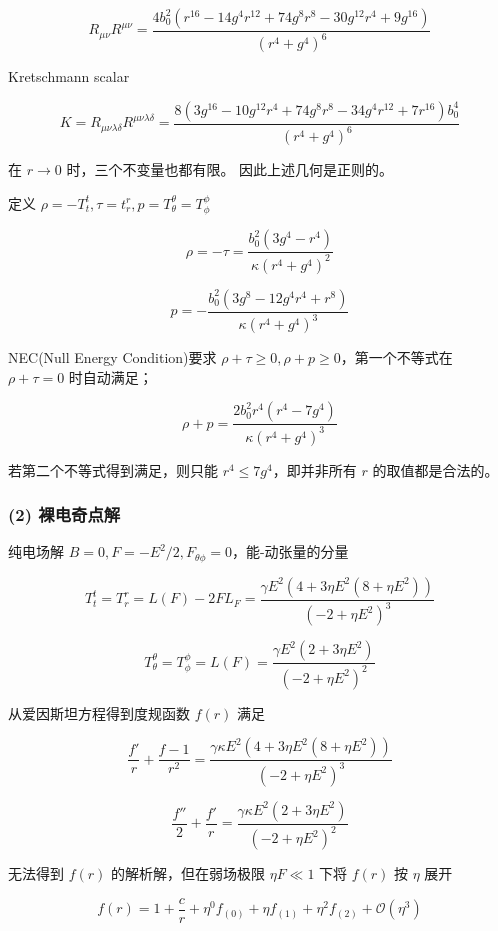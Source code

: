 \documentclass[aps,prl,preprint,groupedaddress]{revtex4-2}
\begin{document}
$$
R_{\mu\nu} R^{\mu\nu}
=\frac{4b_0^2 \left(r^{16}-14g^4r^{12}+74g^8r^8-30g^{12}r^4+9g^{16} \right) }{\left(r^4+g^4 \right)^6 }
$$

Kretschmann scalar

$$
K
=R_{\mu\nu\lambda\delta} R^{\mu\nu\lambda\delta}
=\frac{8\left(3g^{16}-10g^{12}r^4+74 g^8 r^8-34g^4r^{12}+7r^{16} \right)b_0^4 }{\left(r^4+g^4 \right)^6 }
$$

在 $r\to 0$ 时，三个不变量也都有限。 因此上述几何是正则的。

定义 $\rho=-T_t^t,\tau=t_r^r,p=T_\theta^\theta=T_\phi^\phi $

$$
\rho=-\tau
=\frac{b_0^2\left(3g^4-r^4 \right) }{\kappa \left(r^4+g^4 \right)^2 } 
$$

$$
p
=-\frac{b_0^2\left(3g^8-12g^4r^4+r^8 \right) }{\kappa \left(r^4+g^4 \right)^3 }
$$

NEC(Null Energy Condition)要求 $\rho+\tau \geq 0,\rho+p\geq 0 $，第一个不等式在 $\rho+\tau=0 $ 时自动满足；

$$
\rho+p
=\frac{2b_0^2 r^4\left(r^4-7g^4 \right) }{\kappa \left(r^4+g^4 \right)^3 }
$$

若第二个不等式得到满足，则只能 $r^4\leq 7g^4 $，即并非所有 $r$ 的取值都是合法的。

\subsubsection{(2) 裸电奇点解}

纯电场解 $B=0,F=-E^2/2,F_{\theta\phi}=0$，能-动张量的分量

$$
T_t^t = T_r^r
=L(F)-2F L_F 
=\frac{\gamma E^2\left(4+3\eta E^2\left(8+\eta E^2 \right) \right) }{\left(-2+\eta E^2 \right)^3 } 
$$

$$
T_\theta^\theta = T_\phi^\phi
=L(F)
=\frac{\gamma E^2\left(2+3\eta E^2 \right) }{\left(-2+\eta E^2 \right)^2 } 
$$

从爱因斯坦方程得到度规函数 $f(r)$ 满足

$$
\frac{f' }{r } + \frac{f-1 }{r^2 } = \frac{\gamma \kappa E^2 \left(4+3\eta E^2\left(8+\eta E^2 \right) \right) }{\left(-2+\eta E^2 \right)^3 }  
$$

$$
\frac{f'' }{2 } + \frac{f' }{r } = \frac{\gamma \kappa E^2\left(2+3\eta E^2 \right) }{\left(-2+\eta E^2 \right)^2 }  
$$

无法得到 $f(r)$ 的解析解，但在弱场极限 $\eta F\ll 1$ 下将 $f(r)$ 按 $\eta$ 展开

$$
f(r)
=1+\frac{c }{r }+\eta^0 f_{(0)} + \eta f_{(1)} + \eta^2 f_{(2)} + \mathcal{O}\left(\eta^3 \right) 
$$
\end{document}
